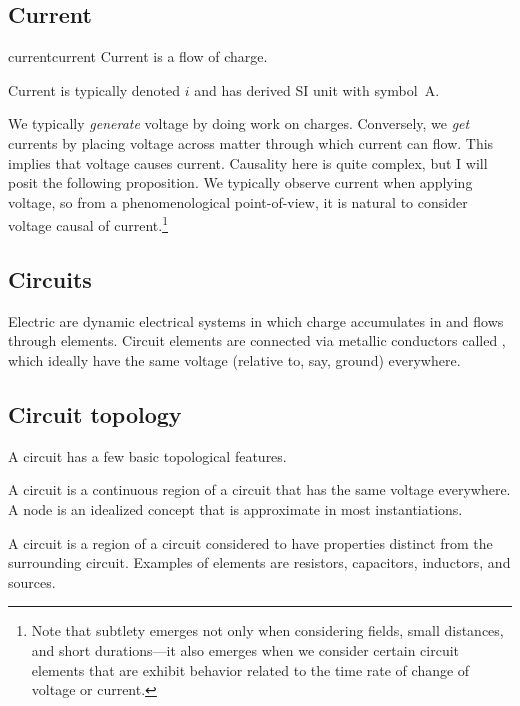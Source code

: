 \documentclass[electronics.tex]{subfiles}
\begin{document}
\subsection{Current}

\begin{Definition}{current}{current}
  Current is a flow of charge.
\end{Definition}

Current is typically denoted $i$ and has derived SI unit  with symbol~A.
\tags{}

We typically \emph{generate} voltage by doing work on charges.
Conversely, we \emph{get} currents by placing voltage across matter through which current can flow.
This implies that voltage causes current.
Causality here is quite complex, but I will posit the following proposition.
We typically observe current when applying
voltage, so from a phenomenological point-of-view, it is natural to consider voltage causal of current.\footnote{Note that subtlety emerges not only when considering fields, small distances, and short durations---it also emerges when we consider certain circuit elements that are exhibit behavior related to the time rate of change of voltage or current.}

\subsection{Circuits}
\tags{}

Electric  are dynamic electrical systems in which charge accumulates in and flows through elements.
Circuit elements are connected via metallic conductors called , which ideally have the same voltage (relative to, say, ground) everywhere.

\subsection{Circuit topology}
\tags{}

A circuit has a few basic topological features.
\tags{}

A circuit  is a continuous region of a circuit that has the same voltage everywhere.
A node is an idealized concept that is approximate in most instantiations.
\tags{}

A circuit  is a region of a circuit considered to have properties distinct from the surrounding circuit.
Examples of elements are resistors, capacitors, inductors, and sources.
\end{document}
